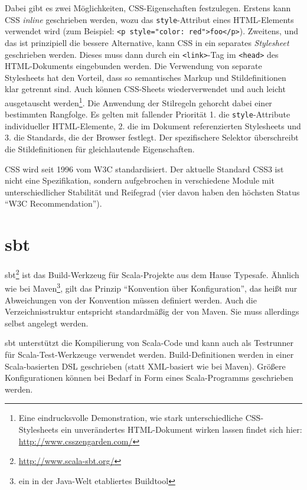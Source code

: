 \documentclass[a4paper, 12pt, hidelinks, listof=totoc, listoftables=totoc, bibliography=totoc]{scrreprt}
\newcommand{\html}[1]{\lstinline[language=HTML5, style=inline]|#1|}
\begin{document}
Dabei gibt es zwei Möglichkeiten, \ac{CSS}-Eigenschaften festzulegen. Erstens kann \ac{CSS} \emph{inline} geschrieben werden, wozu das \html{style}-Attribut eines \ac{HTML}-Elements verwendet wird (zum Beispiel: \html{<p style="color: red">foo</p>}). Zweitens, und das ist prinzipiell die bessere Alternative, kann \ac{CSS} in ein separates \emph{Stylesheet} geschrieben werden. Dieses muss dann durch ein \html{<link>}-Tag im \html{<head>} des \ac{HTML}-Dokuments eingebunden werden. Die Verwendung von separate Stylesheets hat den Vorteil, dass so semantisches Markup und Stildefinitionen klar getrennt sind. Auch können CSS-Sheets wiederverwendet und auch leicht ausgetauscht werden\footnote{Eine eindrucksvolle Demonstration, wie stark unterschiedliche \ac{CSS}-Stylesheets ein unverändertes \ac{HTML}-Dokument wirken lassen findet sich hier: \url{http://www.csszengarden.com/}}. Die Anwendung der Stilregeln gehorcht dabei einer bestimmten Rangfolge. Es gelten mit fallender Priorität 1. die \html{style}-Attribute individueller HTML-Elemente, 2. die im Dokument referenzierten Stylesheets und 3. die Standards, die der Browser festlegt. Der spezifischere Selektor überschreibt die Stildefinitionen für gleichlautende Eigenschaften. \cite[S. 413 ff.]{flanagan2011.JDG}

\ac{CSS} wird seit 1996 vom \ac{W3C} standardisiert. Der aktuelle Standard CSS3 ist nicht eine Spezifikation, sondern aufgebrochen in verschiedene Module mit unterschiedlicher Stabilität und Reifegrad (vier davon haben den höchsten Status "`W3C Recommendation"').



\section{sbt}\label{sec:sbt}

sbt\footnote{\url{http://www.scala-sbt.org/}} ist das Build-Werkzeug für Scala-Projekte aus dem Hause Typesafe.
Ähnlich wie bei Maven\footnote{ein in der Java-Welt etabliertes Buildtool}, gilt das Prinzip "`Konvention über Konfiguration"', das heißt nur Abweichungen von der Konvention müssen definiert werden. Auch die Verzeichnisstruktur entspricht standardmäßig der von Maven. Sie muss allerdings selbst angelegt werden.

sbt unterstützt die Kompilierung von Scala-Code und kann auch als Testrunner für Scala-Test-Werkzeuge verwendet werden.
Build-Definitionen werden in einer Scala-basierten \ac{DSL} geschrieben (statt \ac{XML}-basiert wie bei Maven). Größere Konfigurationen können bei Bedarf in Form eines Scala-Programms geschrieben werden.
\end{document}
